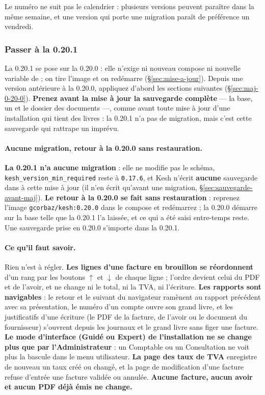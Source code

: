 \documentclass[a4paper,11pt,oneside]{article}
\begin{document}
Le numéro ne suit pas le calendrier : plusieurs versions peuvent paraître dans la même semaine, et une version qui porte une migration paraît de préférence un vendredi.

\subsubsection{Passer à la 0.20.1}\label{sec:maj-0-20-1}
\sloppy

La 0.20.1 se pose sur la 0.20.0 : elle n'exige ni nouveau compose ni nouvelle variable de  ; on tire l'image et on redémarre (\S\ref{sec:mise-a-jour}). Depuis une version antérieure à la 0.20.0, appliquez d'abord les sections suivantes (\S\ref{sec:maj-0-20-0}). \textbf{Prenez avant la mise à jour la sauvegarde complète} --- la base, un  et le dossier des documents ---, comme avant toute mise à jour d'une installation qui tient des livres : la 0.20.1 n'a pas de migration, mais c'est cette sauvegarde qui rattrape un imprévu.

\paragraph{Aucune migration, retour à la 0.20.0 sans restauration.} \textbf{La 0.20.1 n'a aucune migration} : elle ne modifie pas le schéma, \texttt{kesh\_version\_min\_required} reste à \texttt{0.17.6}, et Kesh n'écrit \textbf{aucune} sauvegarde dans  à cette mise à jour (il n'en écrit qu'avant une migration, \S\ref{sec:sauvegarde-avant-maj}). \textbf{Le retour à la 0.20.0 se fait sans restauration} : reprenez l'image \texttt{gcorbaz/kesh:0.20.0} dans le compose et redémarrez ; la 0.20.0 démarre sur la base telle que la 0.20.1 l'a laissée, et ce qui a été saisi entre-temps reste. Une sauvegarde  prise en 0.20.0 s'importe dans la 0.20.1.

\paragraph{Ce qu'il faut savoir.} Rien n'est à régler. \textbf{Les lignes d'une facture en brouillon se réordonnent} d'un rang par les boutons $\uparrow$ et $\downarrow$ de chaque ligne ; l'ordre devient celui du PDF et de l'avoir, et ne change ni le total, ni la TVA, ni l'écriture. \textbf{Les rapports sont navigables} : le retour et le suivant du navigateur ramènent au rapport précédent avec sa présentation, le numéro d'un compte ouvre son grand livre, et les justificatifs d'une écriture (le PDF de la facture, de l'avoir ou le document du fournisseur) s'ouvrent depuis les journaux et le grand livre sans figer une facture. \textbf{Le mode d'interface (Guidé ou Expert) de l'installation ne se change plus que par l'Administrateur} : un Comptable ou un Consultation ne voit plus la bascule dans le menu utilisateur. \textbf{La page des taux de TVA} enregistre de nouveau un taux créé ou changé, et la page de modification d'une facture refuse d'entrée une facture validée ou annulée. \textbf{Aucune facture, aucun avoir et aucun PDF déjà émis ne change.}
\end{document}
